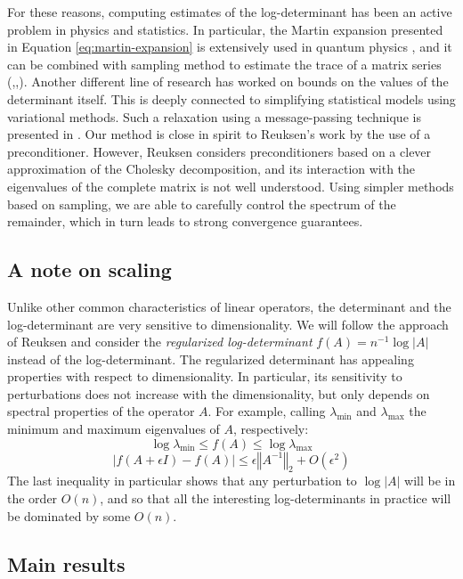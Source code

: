 For these reasons, computing estimates of the log-determinant has
been an active problem in physics and statistics. In particular, the
Martin expansion presented in Equation \eqref{eq:martin-expansion}
is extensively used in quantum physics \cite{Ipsen2006}, and it can
be combined with sampling method to estimate the trace of a matrix
series (\cite{Zhang2008},\cite{McCourt2008},\cite{Zhang2007}).
Another different line of research has worked on bounds on the values
of the determinant itself. This is deeply connected to simplifying
statistical models using variational methods. Such a relaxation using
a message-passing technique is presented in \cite{Wainwright2006}.
Our method is close in spirit to Reuksen's work \cite{Reusken2002}
by the use of a preconditioner. However, Reuksen considers preconditioners
based on a clever approximation of the Cholesky decomposition, and
its interaction with the eigenvalues of the complete matrix is not
well understood. Using simpler methods based on sampling, we are able
to carefully control the spectrum of the remainder, which in turn
leads to strong convergence guarantees.


\subsection{A note on scaling}

Unlike other common characteristics of linear operators, the determinant
and the log-determinant are very sensitive to dimensionality. We will
follow the approach of Reuksen \cite{Reusken2002} and consider the
\emph{regularized log-determinant} $f\left(A\right)=n^{-1}\log\left|A\right|$
instead of the log-determinant. The regularized determinant has appealing
properties with respect to dimensionality. In particular, its sensitivity
to perturbations does not increase with the dimensionality, but only
depends on spectral properties of the operator $A$. For example,
calling $\lambda_{\min}$ and $\lambda_{\max}$ the minimum and maximum
eigenvalues of $A$, respectively: 
\[
\log\lambda_{\min}\leq f\left(A\right)\leq\log\lambda_{\max}
\]
\[
\left|f\left(A+\epsilon I\right)-f\left(A\right)\right|\leq\epsilon\left\Vert A^{-1}\right\Vert _{2}+O\left(\epsilon^{2}\right)
\]
The last inequality in particular shows that any perturbation to $\log\left|A\right|$
will be in the order $O\left(n\right)$, and so that all the interesting
log-determinants in practice will be dominated by some $O\left(n\right)$.


\subsection{Main results}

